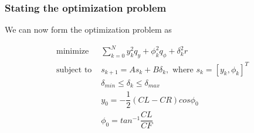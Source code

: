 \subsubsection{Stating the optimization problem}

We can now form the optimization problem as

\begin{align}
  \text{minimize }    & \sum\limits_{k=0}^N y_k^2 q_y + \phi_k^2 q_{\phi} + \delta_k^2 r \\
  \text{subject to }  & s_{k+1} = A s_k + B \delta_k,\text{ where } s_k = [y_k, \phi_k]^T \\
                      & \delta_{min} \leq \delta_k \leq \delta_{max} \\
                      & y_0 = -\dfrac{1}{2}(CL-CR)cos\phi_0 \\
                      & \phi_0 = tan^{-1}\dfrac{CL}{CF}
\end{align}


